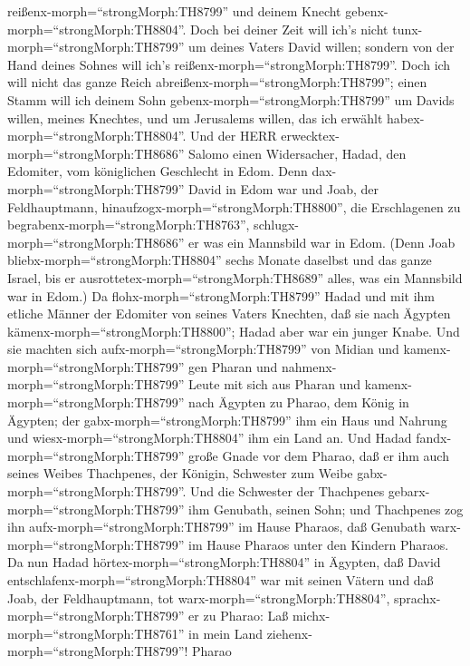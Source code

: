 reißenx-morph=``strongMorph:TH8799'' und deinem Knecht
gebenx-morph=``strongMorph:TH8804''.  Doch bei deiner Zeit
will ich's nicht tunx-morph=``strongMorph:TH8799'' um deines Vaters
David willen; sondern von der Hand deines Sohnes will ich's
reißenx-morph=``strongMorph:TH8799''.  Doch ich will nicht
das ganze Reich abreißenx-morph=``strongMorph:TH8799''; einen Stamm will
ich deinem Sohn gebenx-morph=``strongMorph:TH8799'' um Davids willen,
meines Knechtes, und um Jerusalems willen, das ich erwählt
habex-morph=``strongMorph:TH8804''.  Und der HERR
erwecktex-morph=``strongMorph:TH8686'' Salomo einen Widersacher, Hadad,
den Edomiter, vom königlichen Geschlecht in Edom.  Denn
dax-morph=``strongMorph:TH8799'' David in Edom war und Joab, der
Feldhauptmann, hinaufzogx-morph=``strongMorph:TH8800'', die Erschlagenen
zu begrabenx-morph=``strongMorph:TH8763'',
schlugx-morph=``strongMorph:TH8686'' er was ein Mannsbild war in Edom.
 (Denn Joab bliebx-morph=``strongMorph:TH8804'' sechs
Monate daselbst und das ganze Israel, bis er
ausrottetex-morph=``strongMorph:TH8689'' alles, was ein Mannsbild war in
Edom.)  Da flohx-morph=``strongMorph:TH8799'' Hadad und mit
ihm etliche Männer der Edomiter von seines Vaters Knechten, daß sie nach
Ägypten kämenx-morph=``strongMorph:TH8800''; Hadad aber war ein junger
Knabe.  Und sie machten sich
aufx-morph=``strongMorph:TH8799'' von Midian und
kamenx-morph=``strongMorph:TH8799'' gen Pharan und
nahmenx-morph=``strongMorph:TH8799'' Leute mit sich aus Pharan und
kamenx-morph=``strongMorph:TH8799'' nach Ägypten zu Pharao, dem König in
Ägypten; der gabx-morph=``strongMorph:TH8799'' ihm ein Haus und Nahrung
und wiesx-morph=``strongMorph:TH8804'' ihm ein Land an. 
Und Hadad fandx-morph=``strongMorph:TH8799'' große Gnade vor dem Pharao,
daß er ihm auch seines Weibes Thachpenes, der Königin, Schwester zum
Weibe gabx-morph=``strongMorph:TH8799''.  Und die Schwester
der Thachpenes gebarx-morph=``strongMorph:TH8799'' ihm Genubath, seinen
Sohn; und Thachpenes zog ihn aufx-morph=``strongMorph:TH8799'' im Hause
Pharaos, daß Genubath warx-morph=``strongMorph:TH8799'' im Hause Pharaos
unter den Kindern Pharaos.  Da nun Hadad
hörtex-morph=``strongMorph:TH8804'' in Ägypten, daß David
entschlafenx-morph=``strongMorph:TH8804'' war mit seinen Vätern und daß
Joab, der Feldhauptmann, tot warx-morph=``strongMorph:TH8804'',
sprachx-morph=``strongMorph:TH8799'' er zu Pharao: Laß
michx-morph=``strongMorph:TH8761'' in mein Land
ziehenx-morph=``strongMorph:TH8799''!  Pharao
